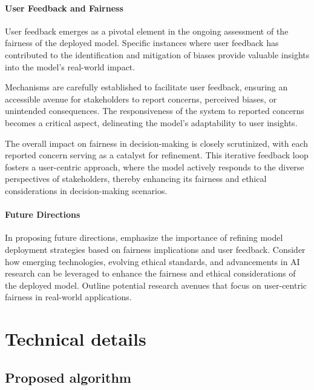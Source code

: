 \documentclass[12pt,a4paper,openright,twoside]{book}
\begin{document}
\subsubsection{User Feedback and Fairness}

User feedback emerges as a pivotal element in the ongoing assessment of the fairness of the deployed model. Specific instances where user feedback has contributed to the identification and mitigation of biases provide valuable insights into the model's real-world impact.

Mechanisms are carefully established to facilitate user feedback, ensuring an accessible avenue for stakeholders to report concerns, perceived biases, or unintended consequences. The responsiveness of the system to reported concerns becomes a critical aspect, delineating the model's adaptability to user insights.

The overall impact on fairness in decision-making is closely scrutinized, with each reported concern serving as a catalyst for refinement. This iterative feedback loop fosters a user-centric approach, where the model actively responds to the diverse perspectives of stakeholders, thereby enhancing its fairness and ethical considerations in decision-making scenarios.

\subsubsection{Future Directions}

In proposing future directions, emphasize the importance of refining model deployment strategies based on fairness implications and user feedback. Consider how emerging technologies, evolving ethical standards, and advancements in AI research can be leveraged to enhance the fairness and ethical considerations of the deployed model. Outline potential research avenues that focus on user-centric fairness in real-world applications.

\chapter{Technical details}
\label{chap:technicals}

\section{Proposed algorithm}
\end{document}
